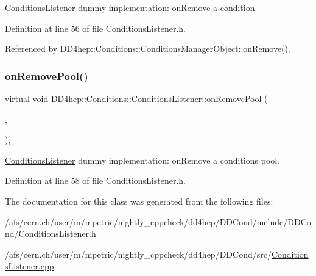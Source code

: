 \hyperlink{class_d_d4hep_1_1_conditions_1_1_conditions_listener}{Conditions\+Listener} dummy implementation\+: on\+Remove a condition. 



Definition at line 56 of file Conditions\+Listener.\+h.



Referenced by D\+D4hep\+::\+Conditions\+::\+Conditions\+Manager\+Object\+::on\+Remove().

\hypertarget{class_d_d4hep_1_1_conditions_1_1_conditions_listener_aadd6949fa8606ac66cab08494ab79412}{}\label{class_d_d4hep_1_1_conditions_1_1_conditions_listener_aadd6949fa8606ac66cab08494ab79412} 
\subsubsection{\texorpdfstring{on\+Remove\+Pool()}{onRemovePool()}}
{\footnotesize\ttfamily virtual void D\+D4hep\+::\+Conditions\+::\+Conditions\+Listener\+::on\+Remove\+Pool (\begin{DoxyParamCaption}\item[{\hyperlink{class_d_d4hep_1_1_conditions_1_1_conditions_pool}{Conditions\+Pool} $\ast$}]{,  }\item[{void $\ast$}]{ }\end{DoxyParamCaption})\hspace{0.3cm}{\ttfamily [inline]}, {\ttfamily [virtual]}}



\hyperlink{class_d_d4hep_1_1_conditions_1_1_conditions_listener}{Conditions\+Listener} dummy implementation\+: on\+Remove a conditions pool. 



Definition at line 58 of file Conditions\+Listener.\+h.



The documentation for this class was generated from the following files\+:\begin{DoxyCompactItemize}
\item 
/afs/cern.\+ch/user/m/mpetric/nightly\+\_\+cppcheck/dd4hep/\+D\+D\+Cond/include/\+D\+D\+Cond/\hyperlink{_conditions_listener_8h}{Conditions\+Listener.\+h}\item 
/afs/cern.\+ch/user/m/mpetric/nightly\+\_\+cppcheck/dd4hep/\+D\+D\+Cond/src/\hyperlink{_conditions_listener_8cpp}{Conditions\+Listener.\+cpp}\end{DoxyCompactItemize}
